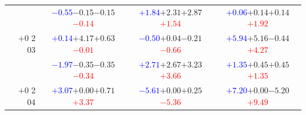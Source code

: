\documentclass[compress]{beamer}
\begin{document}
\begin{frame}
\begin{tabular}{r | c | c | c}
          & \textcolor{blue}{$-0.55$}\hspace{0.1 cm}$-0.15$\hspace{0.1 cm}$-0.15$\hspace{0.1 cm}\textcolor{red}{$-0.14$} & \textcolor{blue}{$+1.84$}\hspace{0.1 cm}$+2.31$\hspace{0.1 cm}$+2.87$\hspace{0.1 cm}\textcolor{red}{$+1.54$} & \textcolor{blue}{$+0.06$}\hspace{0.1 cm}$+0.14$\hspace{0.1 cm}$+0.14$\hspace{0.1 cm}\textcolor{red}{$+1.92$} \\
$+$0 2 03 & \textcolor{blue}{$+0.14$}\hspace{0.1 cm}$+4.17$\hspace{0.1 cm}$+0.63$\hspace{0.1 cm}\textcolor{red}{$-0.01$} & \textcolor{blue}{$-0.50$}\hspace{0.1 cm}$+0.04$\hspace{0.1 cm}$-0.21$\hspace{0.1 cm}\textcolor{red}{$-0.66$} & \textcolor{blue}{$+5.94$}\hspace{0.1 cm}$+5.16$\hspace{0.1 cm}$-0.44$\hspace{0.1 cm}\textcolor{red}{$+4.27$} \\
          & \textcolor{blue}{$-1.97$}\hspace{0.1 cm}$-0.35$\hspace{0.1 cm}$-0.35$\hspace{0.1 cm}\textcolor{red}{$-0.34$} & \textcolor{blue}{$+2.71$}\hspace{0.1 cm}$+2.67$\hspace{0.1 cm}$+3.23$\hspace{0.1 cm}\textcolor{red}{$+3.66$} & \textcolor{blue}{$+1.35$}\hspace{0.1 cm}$+0.45$\hspace{0.1 cm}$+0.45$\hspace{0.1 cm}\textcolor{red}{$+1.35$} \\
$+$0 2 04 & \textcolor{blue}{$+3.07$}\hspace{0.1 cm}$+0.00$\hspace{0.1 cm}$+0.71$\hspace{0.1 cm}\textcolor{red}{$+3.37$} & \textcolor{blue}{$-5.61$}\hspace{0.1 cm}$+0.00$\hspace{0.1 cm}$+0.25$\hspace{0.1 cm}\textcolor{red}{$-5.36$} & \textcolor{blue}{$+7.20$}\hspace{0.1 cm}$+0.00$\hspace{0.1 cm}$-5.20$\hspace{0.1 cm}\textcolor{red}{$+9.49$} \\

\end{tabular}
\end{frame}
\end{document}
